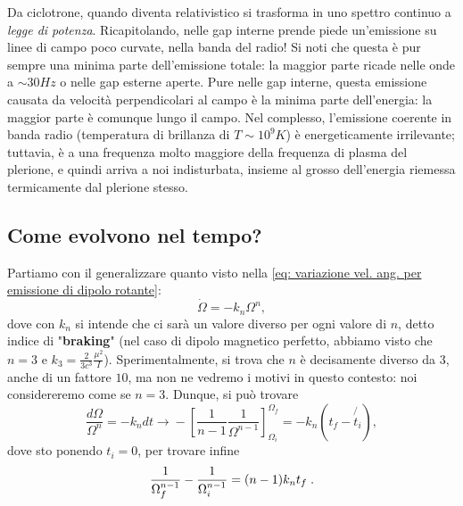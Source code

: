 Da ciclotrone, quando diventa relativistico si trasforma in uno spettro continuo a \textit{legge di potenza}.
Ricapitolando, nelle gap interne prende piede un'emissione su linee di campo poco curvate, nella banda del radio!
Si noti che questa è pur sempre una minima parte dell'emissione totale:
la maggior parte ricade nelle onde a $\sim30Hz$ o nelle gap esterne aperte.
Pure nelle gap interne, questa emissione causata da velocità perpendicolari al campo è la minima parte dell'energia: la maggior parte è comunque lungo il campo. 
Nel complesso, l'emissione coerente in banda radio (temperatura di brillanza di $T\sim10^9K$) è energeticamente irrilevante; tuttavia, è a una frequenza molto maggiore della frequenza di plasma del plerione, e quindi arriva a noi indisturbata, insieme al grosso dell'energia riemessa termicamente dal plerione stesso.


\subsection{Come evolvono nel tempo?}
Partiamo con il generalizzare quanto visto nella \eqref{eq: variazione vel. ang. per emissione di dipolo rotante}:
\begin{equation}
    \dot{\Omega}=-k_n\Omega^n,
    \label{eq: generalizzazione variazione Omega}
\end{equation}
dove con $k_n$ si intende che ci sarà un valore diverso per ogni valore di $n$, detto indice di "\textbf{braking}" (nel caso di dipolo magnetico perfetto, abbiamo visto che $n=3$ e $k_3=\frac{2}{3c^3}\frac{\mu^2}{I}$).
Sperimentalmente, si trova che $n$ è decisamente diverso da $3$, anche di un fattore $10$, ma non ne vedremo i motivi in questo contesto: noi considereremo come se $n=3$.
Dunque, si può trovare
\begin{equation}
    \frac{d\Omega}{\Omega^n}=-k_ndt \xrightarrow{} -\left[ \frac{1}{n-1}\frac{1}{\Omega^{n-1}} \right]_{\Omega_i}^{\Omega_f} = -k_n(t_f-\not {t_i}),
\end{equation}
dove sto ponendo $t_i =0 $, per trovare infine
\begin{equation}
    \frac{1}{\Omega_f^{n-1}} - \frac{1}{\Omega_i^{n-1}}= (n-1)k_nt_f\hspace{1mm}.
    \label{eq: evoluzione temporale velocità angolare}
\end{equation}

